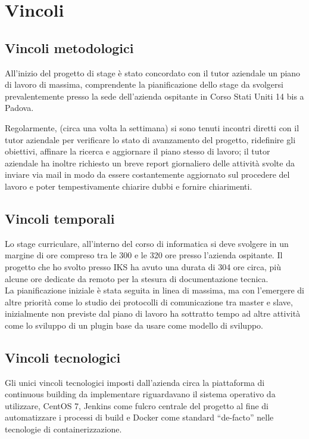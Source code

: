\section{Vincoli}
\subsection{Vincoli metodologici}

All'inizio del progetto di stage è stato concordato con il tutor aziendale un piano di lavoro di massima, comprendente la pianificazione dello stage da svolgersi prevalentemente presso la sede dell'azienda ospitante in Corso Stati Uniti 14 bis a Padova.

Regolarmente, (circa una volta la settimana) si sono tenuti incontri diretti con il tutor aziendale  per verificare lo stato di avanzamento del progetto, ridefinire gli obiettivi, affinare
la ricerca e aggiornare il piano stesso di lavoro; il tutor aziendale ha inoltre richiesto un breve report giornaliero delle attività svolte da inviare via mail in modo da essere costantemente aggiornato sul procedere del lavoro e poter tempestivamente chiarire dubbi e fornire chiarimenti.

\subsection{Vincoli temporali}
Lo stage curriculare, all'interno del corso di informatica si deve svolgere in un margine di ore compreso tra le 300 e le 320 ore presso l'azienda ospitante. Il progetto che ho svolto presso IKS ha avuto una durata di 304 ore circa, più alcune ore dedicate da remoto per la stesura di documentazione tecnica. \\

La pianificazione iniziale è stata seguita in linea di massima, ma con l'emergere di altre priorità come lo studio dei protocolli di comunicazione tra \gls{master} e \gls{slave}, inizialmente non previste dal piano di lavoro ha sottratto tempo ad altre attività come lo sviluppo di un \gls{plugin} base da usare come modello di sviluppo.

\subsection{Vincoli tecnologici}

Gli unici vincoli tecnologici imposti dall'azienda circa la piattaforma di \gls{continuous building} da implementare riguardavano il sistema operativo da utilizzare, \gls{CentOS} 7, Jenkins come fulcro centrale del progetto al fine di automatizzare i processi di \gls{build} e Docker come standard ``de-facto'' nelle tecnologie di containerizzazione.

